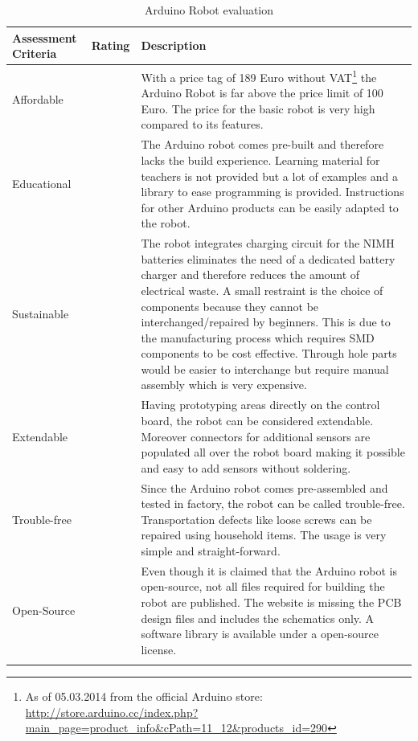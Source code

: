 \begin{longtabu} to \textwidth { X[1,l] X[1,l] X[4,l]}
\toprule
Assessment Criteria    & Rating & Description \\
\midrule
Affordable      &     & With a price tag of 189 Euro without VAT\footnote{As of 05.03.2014 from the official Arduino store: \url{http://store.arduino.cc/index.php?main_page=product_info&cPath=11_12&products_id=290}} the Arduino Robot is far above the price limit of 100 Euro. The price for the basic robot is very high compared to its features.\\
Educational     &      & The Arduino robot comes pre-built and therefore lacks the build experience. Learning material for teachers is not provided but a lot of examples and a library to ease programming is provided. Instructions for other Arduino products can be easily adapted to the robot. \\
Sustainable       &      &  The robot integrates charging circuit for the NIMH batteries eliminates the need of a dedicated battery charger and therefore reduces the amount of electrical waste. A small restraint is the choice of components because they cannot be interchanged/repaired by beginners. This is due to the manufacturing process which requires SMD components to be cost effective. Through hole parts would be easier to interchange but require manual assembly which is very expensive.\\
Extendable &       &  Having prototyping areas directly on the control board, the robot can be considered extendable. Moreover connectors for additional sensors are populated all over the robot board making it possible and easy to add sensors without soldering.\\
Trouble-free &  & Since the Arduino robot comes pre-assembled and tested in factory, the robot can be called trouble-free. Transportation defects like loose screws can be repaired using household items. The usage is very simple and straight-forward.\\
Open-Source &  & Even though it is claimed that the Arduino robot is open-source, not all files required for building the robot are published. The website is missing the PCB design files and includes the schematics only. A software library is available under a open-source license. \\
\bottomrule
\caption{Arduino Robot evaluation}
\label{tbl:arduinorobot_eval}
\end{longtabu}

